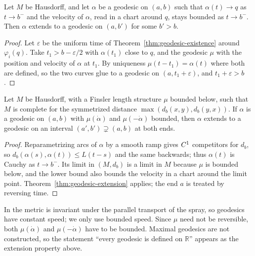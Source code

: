\begin{theorem}
  \label{thm:geodesic-extension}
  \leanok
  Let $M$ be Hausdorff, and let $\alpha$ be a geodesic on $(a, b)$ such that $\alpha(t) \to q$ as
  $t \to b^-$ and the velocity of $\alpha$, read in a chart around $q$, stays bounded as
  $t \to b^-$. Then $\alpha$ extends to a geodesic on $(a, b')$ for some $b' > b$.
\end{theorem}

\begin{proof}
  \leanok
  Let $\varepsilon$ be the uniform time of Theorem~\ref{thm:geodesic-existence} around
  $\varphi_i(q)$. Take $t_1 > b - \varepsilon/2$ with $\alpha(t_1)$ close to $q$, and the geodesic
  $\mu$ with the position and velocity of $\alpha$ at $t_1$. By uniqueness
  $\mu(t - t_1) = \alpha(t)$ where both are defined, so the two curves glue to a geodesic on
  $(a, t_1 + \varepsilon)$, and $t_1 + \varepsilon > b$.
\end{proof}

\begin{theorem}
  \label{thm:finsler-geodesic-extension}
  \leanok
  Let $M$ be Hausdorff, with a Finsler length structure $\mu$ bounded below, such that $M$ is
  complete for the symmetrized distance $\max(d_b(x, y), d_b(y, x))$. If $\alpha$ is a geodesic on
  $(a, b)$ with $\mu(\dot\alpha)$ and $\mu(-\dot\alpha)$ bounded, then $\alpha$ extends to a
  geodesic on an interval $(a', b') \supsetneq (a, b)$ at both ends.
\end{theorem}

\begin{proof}
  \leanok
  Reparametrizing arcs of $\alpha$ by a smooth ramp gives $C^{1}$ competitors for $d_b$, so
  $d_b(\alpha(s), \alpha(t)) \le L(t - s)$ and the same backwards; thus $\alpha(t)$ is Cauchy as
  $t \to b^-$. Its limit in $(M, d_b)$ is a limit in $M$ because $\mu$ is bounded below, and the
  lower bound also bounds the velocity in a chart around the limit point.
  Theorem~\ref{thm:geodesic-extension} applies; the end $a$ is treated by reversing time.
\end{proof}

\begin{remark}
  In \cite{Lar22} the metric is invariant under the parallel transport of the spray, so geodesics
  have constant speed; we only use bounded speed. Since $\mu$ need not be reversible, both
  $\mu(\dot\alpha)$ and $\mu(-\dot\alpha)$ have to be bounded. Maximal geodesics are not
  constructed, so the statement ``every geodesic is defined on $\mathbb{R}$'' appears as the
  extension property above.
\end{remark}


